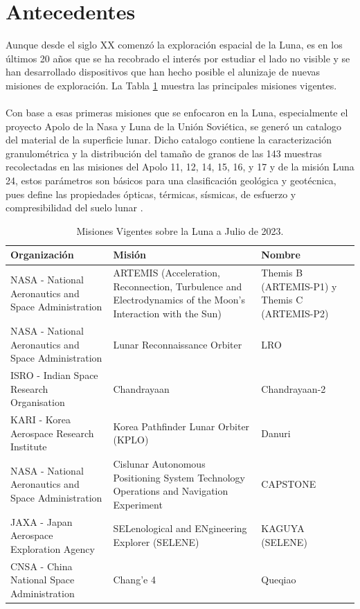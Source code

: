 \documentclass[12pt]{article}
\begin{document}
\section{Antecedentes}
Aunque desde el siglo XX comenzó la exploración espacial de la Luna\parencite{nationalgeographic2024},
es en los últimos 20 años que se ha recobrado el interés por estudiar el lado no visible y se han 
desarrollado dispositivos que han hecho posible el alunizaje de nuevas misiones de 
exploración. La Tabla \ref{tab:misiones} muestra las principales misiones vigentes.\\
\\
Con base a esas primeras misiones que se enfocaron en la Luna, especialmente el proyecto Apolo de la 
Nasa y Luna de 
la Unión Soviética, se generó un catalogo del material 
de la superficie lunar. Dicho catalogo contiene la caracterización granulométrica y la 
distribución del tamaño de granos de las 143 muestras recolectadas en las misiones del Apolo 11, 12, 
14, 15, 16, 
y 17 y de la misión Luna 24, estos parámetros son básicos para una clasificación 
geológica y geotécnica, pues define las propiedades ópticas, térmicas, 
sísmicas, de esfuerzo y compresibilidad del suelo lunar \parencite{graf1993lunar}.\\
\begin{table}[H]
    \centering
    \caption{Misiones Vigentes sobre la Luna a Julio de 2023.}
    \begin{tabular}{|>{\centering\arraybackslash}m{13.07em}|>{\centering\arraybackslash}m{15.07em}|>{\centering\arraybackslash}m{10.145em}|}
        \toprule
        \textbf{Organización} & \textbf{Misión} & \textbf{Nombre} \\
        \midrule
        NASA - National Aeronautics and Space Administration & ARTEMIS (Acceleration, Reconnection, Turbulence and Electrodynamics of the Moon's Interaction with the Sun) & Themis B (ARTEMIS-P1) y Themis C (ARTEMIS-P2) \\
        \midrule
        NASA - National Aeronautics and Space Administration & Lunar Reconnaissance Orbiter & LRO \\
        \midrule
        ISRO - Indian Space Research Organisation & Chandrayaan & Chandrayaan-2 \\
        \midrule
        KARI - Korea Aerospace Research Institute & Korea Pathfinder Lunar Orbiter (KPLO) & Danuri \\
        \midrule
        NASA - National Aeronautics and Space Administration & Cislunar Autonomous Positioning System Technology Operations and Navigation Experiment & CAPSTONE \\
        \midrule
        JAXA - Japan Aerospace Exploration Agency & SELenological and ENgineering Explorer (SELENE) & KAGUYA (SELENE) \\
        \midrule
        CNSA - China National Space Administration & Chang'e 4 & Queqiao \\
        \bottomrule
    \end{tabular}
    \label{tab:misiones}
    \vspace{0.5em} \\
\end{table}
\end{document}
